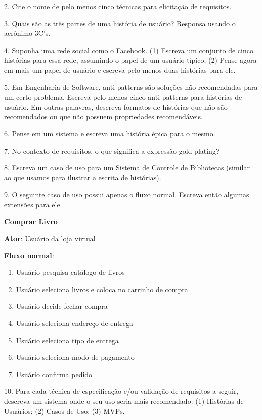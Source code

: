 \documentclass[
  11pt,
  twoside]{book}
\renewenvironment{quote}{\centering \vspace{1.5ex} \begin{tcolorbox}[colback=backcolor, width=4.9in]}{\end{tcolorbox}}
\begin{document}
2. Cite o nome de pelo menos cinco técnicas para elicitação de
requisitos.

3. Quais são as três partes de uma história de usuário? Responsa usando
o acrônimo 3C's.

4. Suponha uma rede social como o Facebook. (1) Escreva um conjunto de
cinco histórias para essa rede, assumindo o papel de um usuário típico;
(2) Pense agora em mais um papel de usuário e escreva pelo menos duas
histórias para ele.

5. Em Engenharia de Software, anti-patterns são soluções não
recomendadas para um certo problema. Escreva pelo menos cinco
anti-patterns para histórias de usuário. Em outras palavras, descreva
formatos de histórias que não são recomendados ou que não possuem
propriedades recomendáveis.

6. Pense em um sistema e escreva uma história épica para o mesmo.

7. No contexto de requisitos, o que significa a expressão gold plating?

8. Escreva um caso de uso para um Sistema de Controle de Bibliotecas
(similar ao que usamos para ilustrar a escrita de histórias).

9. O seguinte caso de uso possui apenas o fluxo normal. Escreva então
algumas extensões para ele.

\begin{quote}
\textbf{Comprar Livro}

\textbf{Ator}: Usuário da loja virtual

\textbf{Fluxo normal}:

\begin{enumerate}
\def\labelenumi{\arabic{enumi}.}
\item
  Usuário pesquisa catálogo de livros
\item
  Usuário seleciona livros e coloca no carrinho de compra
\item
  Usuário decide fechar compra
\item
  Usuário seleciona endereço de entrega
\item
  Usuário seleciona tipo de entrega
\item
  Usuário seleciona modo de pagamento
\item
  Usuário confirma pedido
\end{enumerate}
\end{quote}

10. Para cada técnica de especificação e/ou validação de requisitos a
seguir, descreva um sistema onde o seu uso seria mais recomendado: (1)
Histórias de Usuários; (2) Casos de Uso; (3) MVPs.
\end{document}
